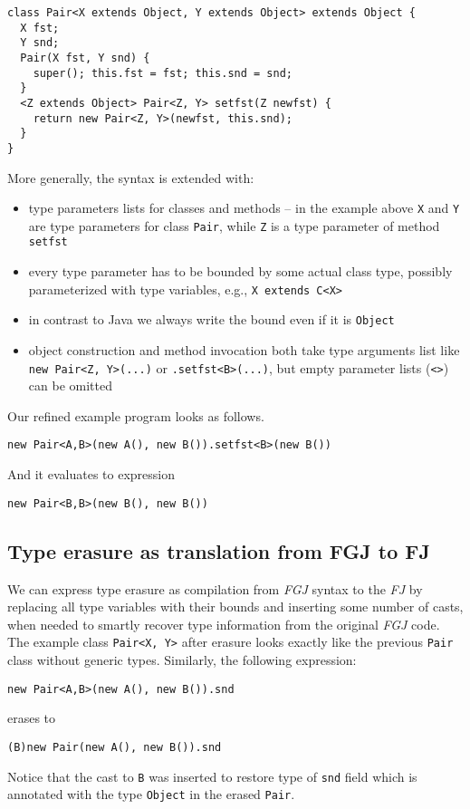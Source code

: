 \documentclass{article}[12pt]
\begin{document}
\begin{verbatim}
class Pair<X extends Object, Y extends Object> extends Object {
  X fst;
  Y snd;
  Pair(X fst, Y snd) {
    super(); this.fst = fst; this.snd = snd;
  }
  <Z extends Object> Pair<Z, Y> setfst(Z newfst) {
    return new Pair<Z, Y>(newfst, this.snd);
  }
}
\end{verbatim}

More generally, the syntax is extended with:

\begin{itemize}
\item type parameters lists for classes and methods -- in the example
  above \texttt{X} and \texttt{Y} are type parameters for class
  \texttt{Pair}, while \texttt{Z} is a type parameter of method
  \texttt{setfst}
\item every type parameter has to be bounded by some actual class
  type, possibly parameterized with type variables, e.g.,
  \texttt{X extends C<X>}
\item in contrast to Java we always write the bound even if it
  is \texttt{Object}
\item object construction and method invocation both take
  type arguments list like \texttt{new Pair<Z, Y>(...)} or
  \texttt{.setfst<B>(...)}, but empty parameter lists (\texttt{<>})
  can be omitted
\end{itemize}

Our refined example program looks as follows.

\begin{verbatim}
new Pair<A,B>(new A(), new B()).setfst<B>(new B())
\end{verbatim}
And it evaluates to expression
\begin{verbatim}
new Pair<B,B>(new B(), new B())
\end{verbatim}

\subsection{Type erasure as translation from FGJ to FJ}

We can express type erasure as compilation from \emph{FGJ} syntax
to the \emph{FJ} by replacing all type variables with their bounds
and inserting some number of casts, when needed to smartly recover
type information from the original \emph{FGJ} code. The example class
\texttt{Pair<X, Y>} after erasure looks exactly like the previous
\texttt{Pair} class without generic types. Similarly, the following
expression:
\begin{verbatim}
new Pair<A,B>(new A(), new B()).snd
\end{verbatim}
erases to
\begin{verbatim}
(B)new Pair(new A(), new B()).snd
\end{verbatim}
Notice that the cast to \texttt{B} was inserted to restore type
of \texttt{snd} field which is annotated with the type \texttt{Object}
in the erased \texttt{Pair}.
\end{document}

